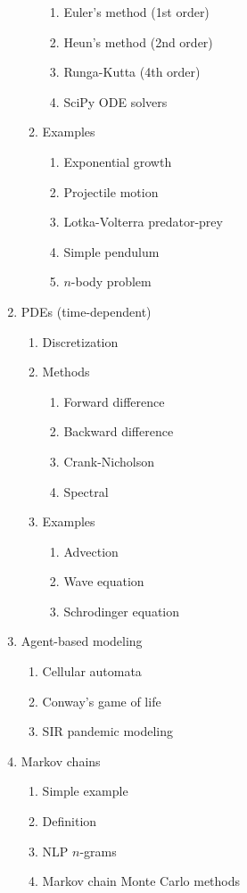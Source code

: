 \documentclass{article}
\begin{document}
\begin{multicols}{2}
\begin{enumerate}
\begin{enumerate}
		\begin{enumerate}
			\item Euler's method (1st order)
			\item Heun's method (2nd order)
			\item Runga-Kutta (4th order)
			\item SciPy ODE solvers
		\end{enumerate}
		\item Examples
		\begin{enumerate}
			\item Exponential growth
			\item Projectile motion
			\item Lotka-Volterra predator-prey
			\item Simple pendulum
			\item $n$-body problem
		\end{enumerate}
	\end{enumerate}
	\item PDEs (time-dependent)
	\begin{enumerate}
		\item Discretization
		\item Methods
		\begin{enumerate}
			\item Forward difference
			\item Backward difference
			\item Crank-Nicholson
			\item Spectral
		\end{enumerate}
		\item Examples
		\begin{enumerate}
			\item Advection
			\item Wave equation
			\item Schrodinger equation
		\end{enumerate}
	\end{enumerate}
	\item Agent-based modeling
	\begin{enumerate}
		\item Cellular automata
		\item Conway's game of life
		\item SIR pandemic modeling
	\end{enumerate}
	\item Markov chains
	\begin{enumerate}
		\item Simple example
		\item Definition
		\item NLP $n$-grams
		\item Markov chain Monte Carlo methods
	\end{enumerate}
\end{enumerate}

\end{multicols}
\end{document}
